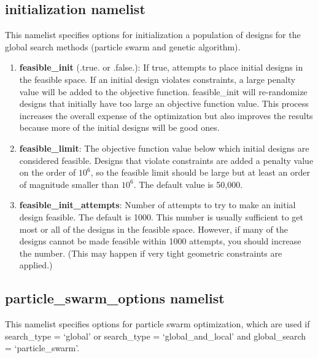 \documentclass[11pt]{article}
\begin{document}
\subsection{initialization namelist}

This namelist specifies options for initialization a population of designs for the global
search methods (particle swarm and genetic algorithm).

\begin{enumerate}
\item{\textbf{feasible\_init} (.true. or .false.): If true, attempts to place initial
designs in the feasible space.  If an initial design violates constraints, a large penalty
value will be added to the objective function.  feasible\_init will re-randomize
designs that initially have too large an objective function value.  
This process increases the overall expense of the optimization but also improves the 
results because more of the initial designs will be good ones.}
\item{\textbf{feasible\_limit}: The objective function value below which initial
designs are considered feasible.  Designs that violate constraints are added a penalty
value on the order of $10^6$, so the feasible limit should be large but at least an order
of magnitude smaller than $10^6$.  The default value is 50,000.}
\item{\textbf{feasible\_init\_attempts}: Number of attempts to try to make an initial
design feasible.  The default is 1000. This number is usually sufficient to get most or
all of the designs in the feasible space.  However, if many of the designs cannot be made
feasible within 1000 attempts, you should increase the number. (This may happen if very
tight geometric constraints are applied.)}
\end{enumerate}

\subsection{particle\_swarm\_options namelist}

This namelist specifies options for particle swarm optimization, which are used if
search\_type = `global' or search\_type = `global\_and\_local' and global\_search =
`particle\_swarm'.
\end{document}
